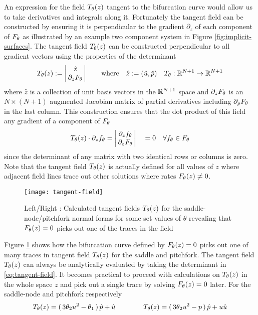 An expression for the field $T_{\theta}(z)$ tangent to the bifurcation curve would allow us to take derivatives and integrals along it. Fortunately the tangent field can be constructed by ensuring it is perpendicular to the gradient $\partial_z$ of each component of $F_{\theta}$ as illustrated by an example two component system in Figure \ref{fig:implicit-surfaces}. The tangent field $T_{\theta}(z)$ can be constructed perpendicular to all gradient vectors using the properties of the determinant \cite{Goldman2005CurvatureSurfaces}
\begin{align}
    T_{\theta}(z):=
    \left|\begin{matrix}
        \hat{z} \\
        \,\partial_{z}F_{\theta}\,
    \end{matrix}\right|
    \qquad\mathrm{where}\quad
    \hat{z}:=(\hat{u},\hat{p})\quad
	T_{\theta} : \mathbb{R}^{N+1}\rightarrow\mathbb{R}^{N+1}
	\label{eq:tangent-field}
\end{align}
where $\hat{z}$ is a collection of unit basis vectors in the $\mathbb{R}^{N+1}$ space and $\partial_{z}F_{\theta}$ is an $N\times(N+1)$ augmented Jacobian matrix of partial derivatives including $\partial_p F_{\theta}$ in the last column. This construction ensures that the dot product of this field any gradient of a component of $F_{\theta}$
\begin{align}
    T_{\theta}(z)\cdot\partial_z f_{\theta} =
    \left|\begin{matrix}
        \partial_z f_{\theta} \\
        \,\partial_{z}F_{\theta}\,
    \end{matrix}\right|
    \quad =0 \quad\forall f_{\theta}\in F_{\theta}
\end{align}
since the determinant of any matrix with two identical rows or columns is zero. Note that the tangent field $T_{\theta}(z)$ is actually defined for all values of $z$ where adjacent field lines trace out other solutions where rates $F_{\theta}(z)\neq0$.

\begin{figure}[H]
\centering{}
\captionsetup{justification=centering}
\texttt{[image: tangent-field]}
\caption{Left/Right : Calculated tangent fields $T_{\theta}(z)$ for the saddle-node/pitchfork normal forms for some set values of $\theta$ revealing that $F_{\theta}(z)=0$ picks out one of the traces in the field}
\label{fig:tangent-field}
\end{figure}

Figure \ref{fig:tangent-field} shows how the bifurcation curve defined by $F_{\theta}(z)=0$ picks out one of many traces in tangent field $T_{\theta}(z)$ for the saddle and pitchfork. The tangent field $T_{\theta}(z)$ can always be analytically evaluated by taking the determinant in \eqref{eq:tangent-field}. It becomes practical to proceed with calculations on $T_{\theta}(z)$ in the whole space $z$ and pick out a single trace by solving $F_{\theta}(z)=0$ later. For the saddle-node and pitchfork respectively
\begin{align}
    T_{\theta}(z)=(\,3\theta_2 u^2-\theta_1\,)\,\hat{p}+\hat{u}
    \qquad\qquad
    T_{\theta}(z)=(\,3\theta_2 u^2-p\,)\,\hat{p}+u\hat{u}
    \label{eq:tangent-field-examples}
\end{align}

